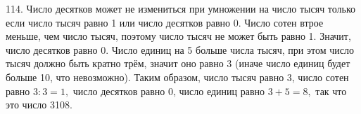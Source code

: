 114. Число десятков может не измениться при умножении на число тысяч только если число тысяч равно 1 или число десятков равно 0. Число сотен втрое меньше, чем число тысяч, поэтому число тысяч не может быть равно 1. Значит, число десятков равно 0. Число единиц на 5 больше числа тысяч, при этом число тысяч должно быть кратно трём, значит оно равно 3 (иначе число единиц будет больше 10, что невозможно). Таким образом, число тысяч равно 3, число сотен равно $3:3=1,$ число десятков равно 0, число единиц равно $3+5=8,$ так что это число 3108.\\
